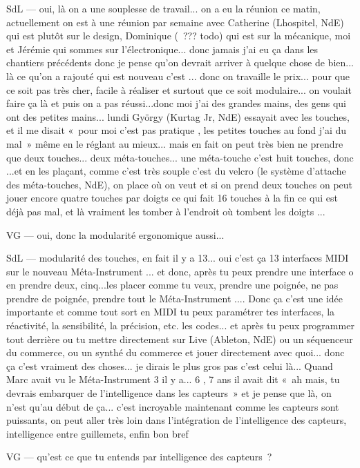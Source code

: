 SdL — oui, là on a une souplesse de travail... on a eu la réunion ce matin, actuellement on est à une réunion par semaine avec Catherine (Lhospitel, NdE) qui est plutôt sur le design, Dominique ( ??? todo) qui est sur la mécanique, moi et Jérémie qui sommes sur l'électronique... donc jamais j'ai eu ça dans les chantiers précédents donc je pense qu'on devrait arriver à quelque chose de bien... là ce qu'on a rajouté qui est nouveau c'est ... donc on travaille le prix... pour que ce soit pas très cher, facile à réaliser et surtout que ce soit modulaire... on voulait faire ça là et puis on a pas réussi...donc moi j'ai des grandes mains, des gens qui ont des petites mains... lundi György (Kurtag Jr, NdE) essayait avec les touches, et il me disait « pour moi c'est pas pratique , les petites touches au fond j'ai du mal » même en le réglant au mieux... mais en fait on peut très bien ne prendre que deux touches... deux méta-touches... une méta-touche c'est huit touches, donc ...et en les plaçant, comme c'est très souple c'est du velcro (le système d'attache des méta-touches, NdE), on place où on veut et si on prend deux touches on peut jouer encore quatre touches par doigts ce qui fait 16 touches à la fin ce qui est déjà pas mal, et là vraiment les tomber à l'endroit où tombent les doigts ... 

VG — oui, donc la modularité ergonomique aussi... 

SdL — modularité des touches, en fait il y a 13... oui c'est ça 13 interfaces MIDI sur le nouveau Méta-Instrument ... et donc, après tu peux prendre une interface o en prendre deux, cinq...les placer comme tu veux, prendre une poignée, ne pas prendre de poignée, prendre tout le Méta-Instrument .... Donc ça c'est une idée importante et comme tout sort en MIDI tu peux paramétrer tes interfaces, la réactivité, la sensibilité, la précision, etc. les codes... et après tu peux programmer tout derrière ou tu mettre directement sur Live (Ableton, NdE) ou un séquenceur du commerce, ou un synthé du commerce et jouer directement avec quoi... donc ça c'est vraiment des choses... je dirais le plus gros pas c'est celui là... Quand Marc avait vu le Méta-Instrument 3 il y a... 6 , 7 ans il avait dit « ah mais, tu devrais embarquer de l'intelligence dans les capteurs » et je pense que là, on n'est qu'au début de ça... c'est incroyable maintenant comme les capteurs sont puissants, on peut aller très loin dans l'intégration de l'intelligence des capteurs, intelligence entre guillemets, enfin bon bref 

VG — qu'est ce que tu entends par intelligence des capteurs ? 

